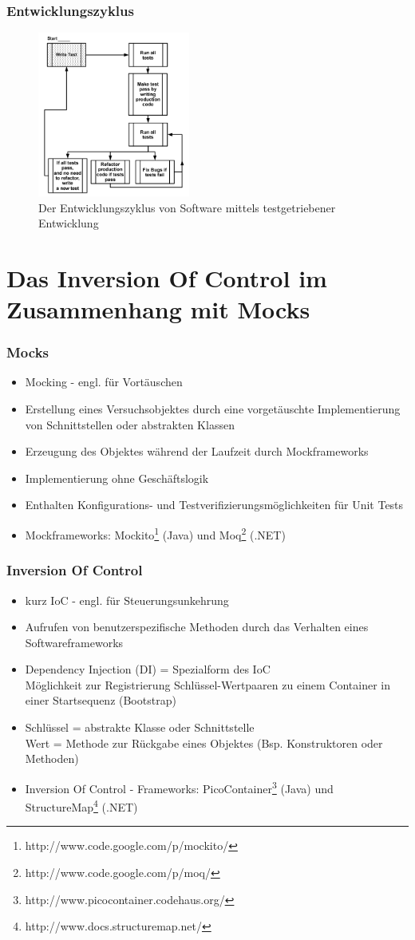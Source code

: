 \documentclass{beamer}
\begin{document}
\begin{frame}
\frametitle{Entwicklungszyklus}
\begin{figure}[htbp]
\includegraphics[width=5cm]{zyklus.png}
\caption{Der Entwicklungszyklus von Software mittels testgetriebener Entwicklung}
\end{figure}
\end{frame}

\section{Das Inversion Of Control im Zusammenhang mit Mocks}
\begin{frame}
\frametitle{Mocks}
\begin{itemize}
\item Mocking - engl. für Vortäuschen
\item Erstellung eines Versuchsobjektes durch eine vorgetäuschte Implementierung von Schnittstellen oder abstrakten Klassen
\item Erzeugung des Objektes während der Laufzeit durch Mockframeworks
\item Implementierung ohne Geschäftslogik
\item Enthalten Konfigurations- und Testverifizierungsmöglichkeiten für Unit Tests
\item Mockframeworks: Mockito\footnote{http://www.code.google.com/p/mockito/} (Java) und Moq\footnote{http://www.code.google.com/p/moq/} (.NET)
\end{itemize}
\end{frame}

\begin{frame}
\frametitle{Inversion Of Control}
\begin{itemize}
\item kurz IoC - engl. für Steuerungsunkehrung
\item Aufrufen von benutzerspezifische Methoden durch das Verhalten eines Softwareframeworks
\item Dependency Injection (DI) = Spezialform des IoC\\Möglichkeit zur Registrierung Schlüssel-Wertpaaren zu einem Container in einer Startsequenz (Bootstrap)
\item Schlüssel = abstrakte Klasse oder Schnittstelle\\Wert = Methode zur Rückgabe eines Objektes (Bsp. Konstruktoren oder Methoden)
\item Inversion Of Control - Frameworks:
PicoContainer\footnote{http://www.picocontainer.codehaus.org/} (Java) und StructureMap\footnote{http://www.docs.structuremap.net/} (.NET)
\end{itemize}
\end{frame}
\end{document}
